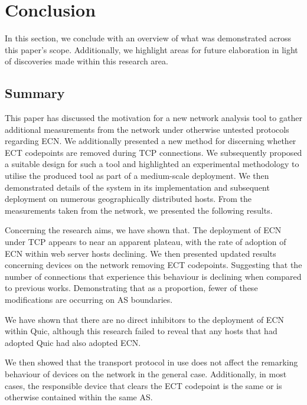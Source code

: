 \documentclass{l4proj}
\begin{document}
\chapter{Conclusion}

In this section, we conclude with an overview of what was demonstrated across this paper's scope. Additionally, we highlight areas for future elaboration in light of discoveries made within this research area.

\section{Summary}


This paper has discussed the motivation for a new network analysis tool to gather additional measurements from the network under otherwise untested protocols regarding ECN. We additionally presented a new method for discerning whether ECT codepoints are removed during TCP connections. We subsequently proposed a suitable design for such a tool and highlighted an experimental methodology to utilise the produced tool as part of a medium-scale deployment. We then demonstrated details of the system in its implementation and subsequent deployment on numerous geographically distributed hosts. From the measurements taken from the network, we presented the following results. 

Concerning the research aims, we have shown that. The deployment of ECN under TCP appears to near an apparent plateau, with the rate of adoption of ECN within web server hosts declining. We then presented updated results concerning devices on the network removing ECT codepoints. Suggesting that the number of connections that experience this behaviour is declining when compared to previous works. Demonstrating that as a proportion, fewer of these modifications are occurring on AS boundaries.

We have shown that there are no direct inhibitors to the deployment of ECN within Quic, although this research failed to reveal that any hosts that had adopted Quic had also adopted ECN.

We then showed that the transport protocol in use does not affect the remarking behaviour of devices on the network in the general case. Additionally, in most cases, the responsible device that clears the ECT codepoint is the same or is otherwise contained within the same AS.
\end{document}
